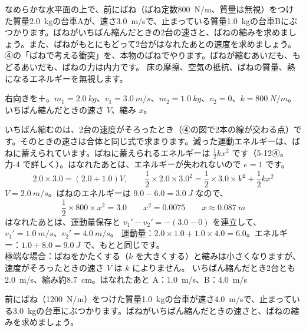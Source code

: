 \label{ph:力-3:ex15}
\begin{phreidai}[ばねのついた台車の衝突]
なめらかな水平面の上で、前にばね（ばね定数\qty{800}{N/m}、質量は無視）をつけた質量\qty{2.0}{kg}の台車Aが、速さ\qty{3.0}{m/s}で、止まっている質量\qty{1.0}{kg}の台車Bにぶつかります。ばねがいちばん縮んだときの2台の速さと、ばねの縮みを求めましょう。また、ばねがもとにもどって2台がはなれたあとの速度を求めましょう。
\phbamen
④の「ばねで考える衝突」を、本物のばねでやります。ばねが縮むあいだも、もどるあいだも、ばねの力は内力です。
\phmushi
床の摩擦、空気の抵抗、ばねの質量、熱になるエネルギーを無視します。
\phzu
\noindent\begin{minipage}[c]{0.5\linewidth}\centering
{}
\end{minipage}\hfill
\begin{minipage}[c]{0.47\linewidth}\raggedright
右向きを＋。$m_1=\qty{2.0}{kg}$、$v_1=\qty{3.0}{m/s}$、$m_2=\qty{1.0}{kg}$、$v_2=0$、$k=\qty{800}{N/m}$。いちばん縮んだときの速さ $V$、縮み $x$。
\end{minipage}
\phriyu
いちばん縮むのは、2台の速度がそろったとき（④の図で2本の線が交わる点）です。そのときの速さは合体と同じ式で求まります。減った運動エネルギーは、ばねに蓄えられています。ばねに蓄えられるエネルギーは $\tfrac{1}{2}kx^2$ です（\mbox{5-12④}。力-4 で詳しく）。はなれたあとは、エネルギーが失われないので $e=1$ です。
\phtateru
\[2.0\times3.0=(2.0+1.0)V,\qquad \frac{1}{2}\times2.0\times3.0^2=\frac{1}{2}\times3.0\times V^2+\frac{1}{2}kx^2\]
\phtoku
$V=\qty{2.0}{m/s}$。ばねのエネルギーは $9.0-6.0=\qty{3.0}{J}$ なので、
\[\frac{1}{2}\times800\times x^2=3.0\qquad x^2=0.0075\qquad x\approx\qty{0.087}{m}\]
はなれたあとは、運動量保存と $v_1'-v_2'=-(3.0-0)$ を連立して、$v_1'=\qty{1.0}{m/s}$、$v_2'=\qty{4.0}{m/s}$。
\phtashikame
運動量：$2.0\times1.0+1.0\times4.0=6.0$。エネルギー：$1.0+8.0=\qty{9.0}{J}$ で、もとと同じです。\\
極端な場合：ばねをかたくする（$k$ を大きくする）と縮みは小さくなりますが、速度がそろったときの速さ $V$ は $k$ によりません。
\kotae いちばん縮んだとき2台とも\qty{2.0}{m/s}、縮み約\qty{8.7}{cm}。はなれたあと A：\qty{1.0}{m/s}、B：\qty{4.0}{m/s}
\end{phreidai}
\begin{jibun}
前にばね（\qty{1200}{N/m}）をつけた質量\qty{1.0}{kg}の台車が速さ\qty{4.0}{m/s}で、止まっている\qty{3.0}{kg}の台車にぶつかります。ばねがいちばん縮んだときの速さと、ばねの縮みを求めましょう。
\end{jibun}

